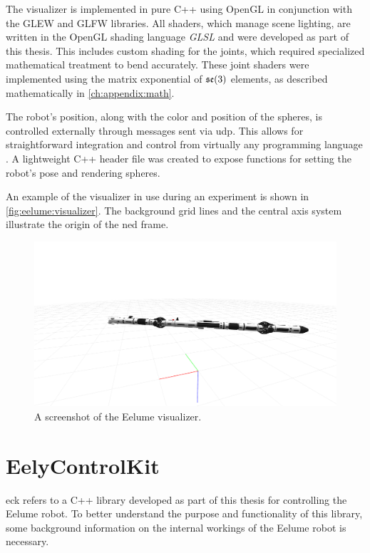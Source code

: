 The visualizer is implemented in pure C++ using OpenGL in conjunction with the 
GLEW and GLFW libraries. All shaders, which manage scene lighting, are written 
in the OpenGL shading language \textit{GLSL} and were developed as part of 
this thesis. This includes custom shading for the joints, which required 
specialized mathematical treatment to bend accurately. These joint shaders 
were implemented using the matrix exponential of \(\mathfrak{se}(3)\) elements, as 
described mathematically in \autoref{ch:appendix:math}.

The robot's position, along with the color and position of the spheres, is 
controlled externally through messages sent via \gls{udp}. This allows for 
straightforward integration and control from virtually any programming language
. A lightweight C++ header file was created to expose functions for setting 
the robot's pose and rendering spheres.

An example of the visualizer in use during an experiment is shown in
\autoref{fig:eelume:visualizer}. The background grid lines and the central
axis system illustrate the origin of the \gls{ned} frame.
\begin{figure}[h!]
    \centering
    \includegraphics[width=\textwidth]{assets/eely-visualizer.png}
    \caption{A screenshot of the Eelume visualizer.}
    \label{fig:eelume:visualizer}
\end{figure}

\FloatBarrier

\section{EelyControlKit}

\gls{eck} refers to a C++ library developed as part of this thesis for 
controlling the Eelume robot.  
To better understand the purpose and functionality of this library, some 
background information on the internal workings of the Eelume robot is 
necessary.

